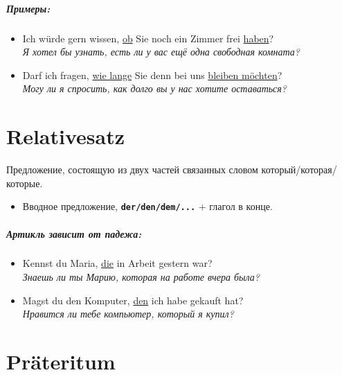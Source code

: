 \documentclass[12pt,a4paper]{report}
\newcommand{\term}[1]{\texttt{\textbf{#1}}}
\newcommand{\satzew}[1]{\underline{#1}}
\newcommand{\ubersatze}[1]{\textit{#1}}
\begin{document}
\paragraph{Примеры:}
\begin{itemize}
 \item Ich würde gern wissen, \satzew{ob} Sie noch ein Zimmer frei \satzew{haben}?
 ~\\ \ubersatze{Я хотел бы узнать, есть ли у вас ещё одна свободная комната?}
 \item Darf ich fragen, \satzew{wie lange} Sie denn bei uns \satzew{bleiben möchten}?
 ~\\ \ubersatze{Могу ли я спросить, как долго вы у нас хотите оставаться?}
\end{itemize}


\newpage

\chapter{Relativesatz}

Предложение, состоящую из двух частей связанных словом который/которая/которые.

\begin{itemize}
 \item Вводное предложение, \term{der/den/dem/...} + глагол в конце.
\end{itemize}

\paragraph{Артикль зависит от падежа:}
\begin{itemize}
 \item Kennst du Maria, \satzew{die} in Arbeit gestern war?
 ~\\ \ubersatze{Знаешь ли ты Марию, которая на работе вчера была?}
 \item Magst du den Komputer, \satzew{den} ich habe gekauft hat?
 ~\\ \ubersatze{Нравится ли тебе компьютер, который я купил?}
\end{itemize}

\chapter{Präteritum}
\end{document}
